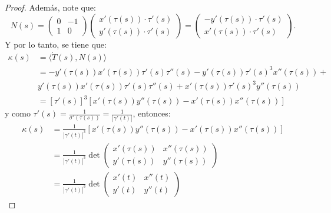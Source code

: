\documentclass[12pt]{article}
\begin{document}
\begin{proof}
Adem\'as, note que:
\begin{equation*}
N(s)=\begin{pmatrix} 0 & -1 \\ 1 & 0 \end{pmatrix}\begin{pmatrix} x'(\tau(s))\cdot \tau'(s)\\ y'(\tau(s))\cdot \tau'(s)\end{pmatrix}=\begin{pmatrix} -y'(\tau(s))\cdot \tau'(s)\\ x'(\tau(s))\cdot \tau'(s)\end{pmatrix}.
\end{equation*}
Y por lo tanto, se tiene que:
\begin{equation*}
\begin{split}
\kappa (s)&=\langle \dot{T}(s),N(s) \rangle\\
&=-y'(\tau(s))x'(\tau(s))\tau'(s)\tau''(s)-y'(\tau(s))\tau'(s)^3x''(\tau(s))+\\
&y'(\tau(s))x'(\tau(s))\tau'(s)\tau''(s)+x'(\tau(s))\tau'(s)^3y''(\tau(s))\\
&=[\tau'(s)]^3[x'(\tau(s))y''(\tau(s))-x'(\tau(s))x''(\tau(s))]
\end{split}
\end{equation*}
y como $\tau'(s)=\frac{1}{\sigma'(\tau(s))}=\frac{1}{|\gamma'(t)|}$, entonces:
\begin{equation*}
\begin{split}
\kappa(s)&=\frac{1}{|\gamma'(t)|^3}[x'(\tau(s))y''(\tau(s))-x'(\tau(s))x''(\tau(s))]\\
&=\frac{1}{|\gamma'(t)|^3}\det\begin{pmatrix} x'(\tau(s)) & x''(\tau(s))\\ y'(\tau(s)) & y''(\tau(s))\end{pmatrix}\\
&=\frac{1}{|\gamma'(t)|^3}\det\begin{pmatrix} x'(t) & x''(t)\\y'(t) & y''(t)\end{pmatrix}
\end{split}
\end{equation*}

\end{proof}
\end{document}

